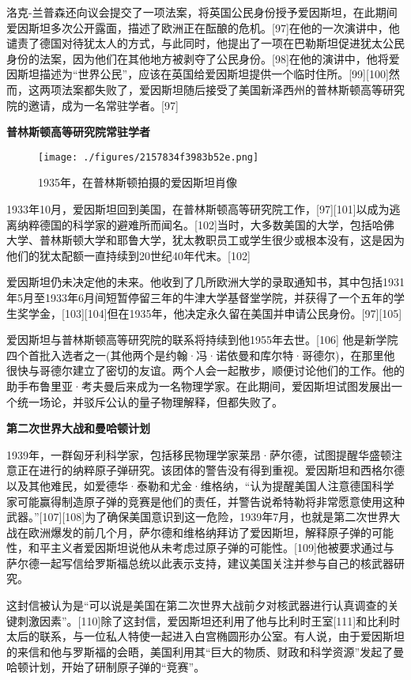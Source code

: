 洛克-兰普森还向议会提交了一项法案，将英国公民身份授予爱因斯坦，在此期间爱因斯坦多次公开露面，描述了欧洲正在酝酿的危机。[97]在他的一次演讲中，他谴责了德国对待犹太人的方式，与此同时，他提出了一项在巴勒斯坦促进犹太公民身份的法案，因为他们在其他地方被剥夺了公民身份。[98]在他的演讲中，他将爱因斯坦描述为“世界公民”，应该在英国给爱因斯坦提供一个临时住所。[99][100]然而，这两项法案都失败了，爱因斯坦随后接受了美国新泽西州的普林斯顿高等研究院的邀请，成为一名常驻学者。[97]

\textbf{普林斯顿高等研究院常驻学者}

\begin{figure}[ht]
\centering
\texttt{[image: ./figures/2157834f3983b52e.png]}
\caption{1935年，在普林斯顿拍摄的爱因斯坦肖像} \label{fig_AYST_12}
\end{figure}
1933年10月，爱因斯坦回到美国，在普林斯顿高等研究院工作，[97][101]以成为逃离纳粹德国的科学家的避难所而闻名。[102]当时，大多数美国的大学，包括哈佛大学、普林斯顿大学和耶鲁大学，犹太教职员工或学生很少或根本没有，这是因为他们的犹太配额一直持续到20世纪40年代末。[102]

爱因斯坦仍未决定他的未来。他收到了几所欧洲大学的录取通知书，其中包括1931年5月至1933年6月间短暂停留三年的牛津大学基督堂学院，并获得了一个五年的学生奖学金，[103][104]但在1935年，他决定永久留在美国并申请公民身份。[97][105]

爱因斯坦与普林斯顿高等研究院的联系将持续到他1955年去世。[106] 他是新学院四个首批入选者之一(其他两个是约翰·冯·诺依曼和库尔特·哥德尔)，在那里他很快与哥德尔建立了密切的友谊。两个人会一起散步，顺便讨论他们的工作。他的助手布鲁里亚·考夫曼后来成为一名物理学家。在此期间，爱因斯坦试图发展出一个统一场论，并驳斥公认的量子物理解释，但都失败了。

\textbf{第二次世界大战和曼哈顿计划}

1939年，一群匈牙利科学家，包括移民物理学家莱昂·萨尔德，试图提醒华盛顿注意正在进行的纳粹原子弹研究。该团体的警告没有得到重视。爱因斯坦和西格尔德以及其他难民，如爱德华·泰勒和尤金·维格纳，“认为提醒美国人注意德国科学家可能赢得制造原子弹的竞赛是他们的责任，并警告说希特勒将非常愿意使用这种武器。”[107][108]为了确保美国意识到这一危险，1939年7月，也就是第二次世界大战在欧洲爆发的前几个月，萨尔德和维格纳拜访了爱因斯坦，解释原子弹的可能性，和平主义者爱因斯坦说他从未考虑过原子弹的可能性。[109]他被要求通过与萨尔德一起写信给罗斯福总统以此表示支持，建议美国关注并参与自己的核武器研究。

这封信被认为是“可以说是美国在第二次世界大战前夕对核武器进行认真调查的关键刺激因素”。[110]除了这封信，爱因斯坦还利用了他与比利时王室[111]和比利时太后的联系，与一位私人特使一起进入白宫椭圆形办公室。有人说，由于爱因斯坦的来信和他与罗斯福的会晤，美国利用其“巨大的物质、财政和科学资源”发起了曼哈顿计划，开始了研制原子弹的“竞赛”。

